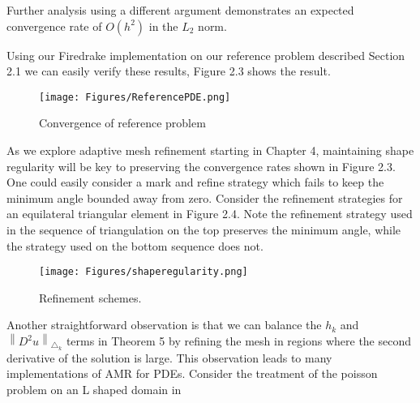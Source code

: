 \documentclass[12 pt]{report}
\newcommand{\norm}[2]{\left \lVert #1 \right \rVert_{#2}}
\begin{document}
Further analysis using a different argument demonstrates an expected convergence rate of $O(h^2)$ in the $L_2$ norm. 

Using our Firedrake implementation on our reference problem described Section 2.1 we can easily verify these results, Figure 2.3 shows the result. 
\begin{figure}[H]
  \begin{center}
      \texttt{[image: Figures/ReferencePDE.png]}
      \label{fig:Reference Problem Convergence}
    \caption{Convergence of reference problem}
  \end{center}
\end{figure}


As we explore adaptive mesh refinement starting in Chapter 4, maintaining shape regularity will be key to preserving the convergence rates shown in Figure 2.3. One could easily consider a mark and refine strategy which fails to keep the minimum angle bounded away from zero. Consider the refinement strategies for an equilateral triangular element in Figure 2.4. Note the refinement strategy used in the sequence of triangulation on the top preserves the minimum angle, while the strategy used on the bottom sequence does not.


\begin{figure}[H]
  \begin{center}
  \texttt{[image: Figures/shaperegularity.png]}
\caption{Refinement schemes.}
\end{center}
\end{figure}

Another straightforward observation is that we can balance the $h_k$ and $\norm{D^2u}{\triangle_k}$ terms in Theorem 5 by refining the mesh in regions where the second derivative of the solution is large. This observation leads to many implementations of AMR for PDEs. Consider the treatment of the poisson problem on an L shaped domain in \citet[page 48, Figure 1.19]{elman_finite_2005}
\end{document}
